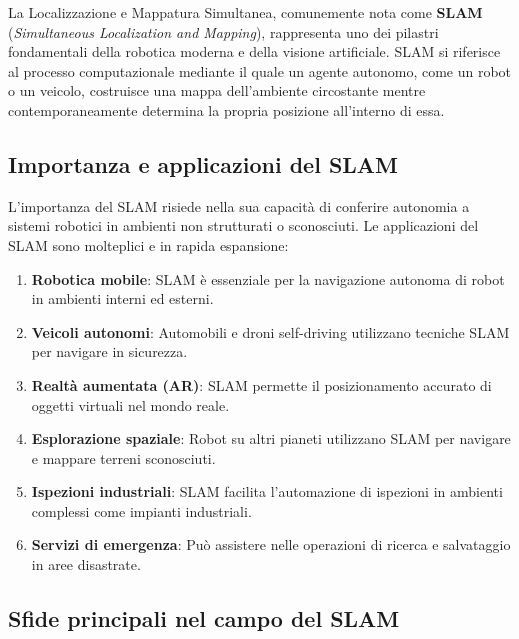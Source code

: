 \documentclass[12pt,a4paper]{report}
\begin{document}
La Localizzazione e Mappatura Simultanea, comunemente nota come \textbf{SLAM} (\textit{Simultaneous Localization and Mapping}), rappresenta uno dei pilastri fondamentali della robotica moderna e della visione artificiale. SLAM si riferisce al processo computazionale mediante il quale un agente autonomo, come un robot o un veicolo, costruisce una mappa dell'ambiente circostante mentre contemporaneamente determina la propria posizione all'interno di essa.

\vspace{1cm}

\subsection{Importanza e applicazioni del SLAM}

L'importanza del SLAM risiede nella sua capacità di conferire autonomia a sistemi robotici in ambienti non strutturati o sconosciuti. Le applicazioni del SLAM sono molteplici e in rapida espansione:


\begin{enumerate}
    \item \textbf{Robotica mobile}: SLAM è essenziale per la navigazione autonoma di robot in ambienti interni ed esterni.
    \item \textbf{Veicoli autonomi}: Automobili e droni self-driving utilizzano tecniche SLAM per navigare in sicurezza.
    \item \textbf{Realtà aumentata (AR)}: SLAM permette il posizionamento accurato di oggetti virtuali nel mondo reale.
    \item \textbf{Esplorazione spaziale}: Robot su altri pianeti utilizzano SLAM per navigare e mappare terreni sconosciuti.
    \item \textbf{Ispezioni industriali}: SLAM facilita l'automazione di ispezioni in ambienti complessi come impianti industriali.
    \item \textbf{Servizi di emergenza}: Può assistere nelle operazioni di ricerca e salvataggio in aree disastrate.
\end{enumerate}

\subsection{Sfide principali nel campo del SLAM}
\end{document}
